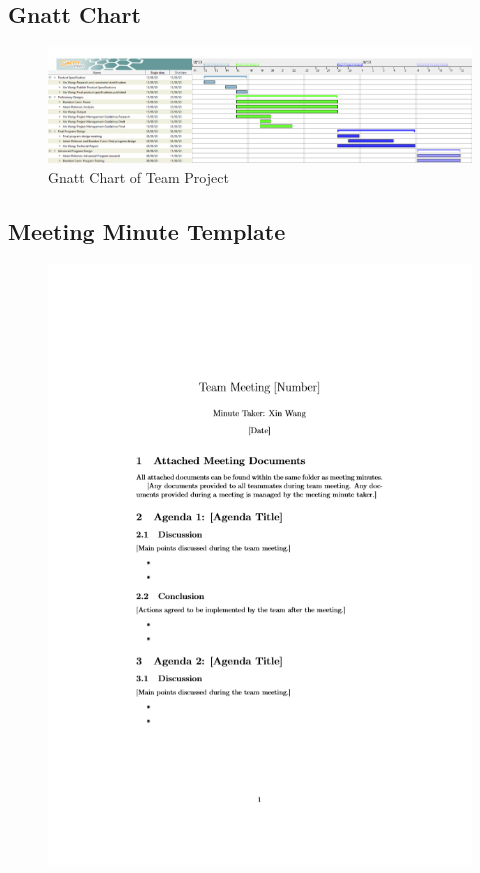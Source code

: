 \documentclass[12pt,a4paper]{article}
\begin{document}
\begin{landscape}
	\subsection{Gnatt Chart}
	\begin{center}
		\begin{figure}[htb]
		\includegraphics[width=\linewidth]{Project Gnatt.PNG}
		\caption{Gnatt Chart of Team Project}
		\label{fig:landscape}
		\end{figure}
	\end{center}
\end{landscape}
\pagebreak

\subsection{Meeting Minute Template}
\begin{figure}[h!]
	\centering
	\includegraphics[width=\textwidth]{Minute1.PNG}
\end{figure}
\end{document}
